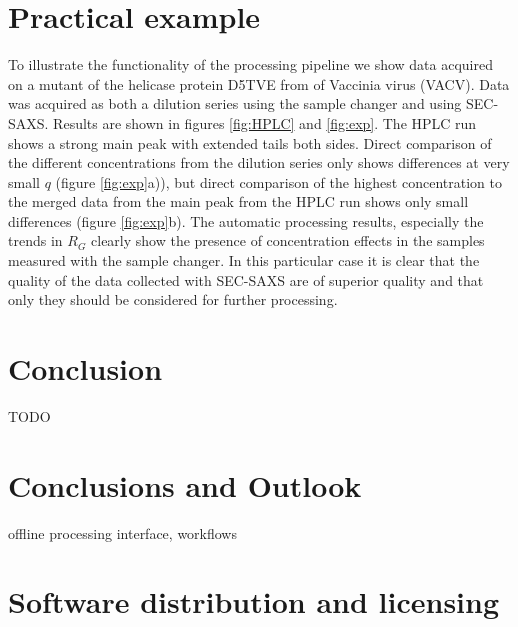 \documentclass[preprint,pdf]{iucr}              %
\begin{document}
\section{Practical example}
To illustrate the functionality of the processing pipeline we show data acquired
on a mutant of the helicase protein D5TVE from  of Vaccinia virus (VACV). 
Data was acquired as both a dilution series using the sample changer and using
SEC-SAXS.  
Results are shown in figures \ref{fig:HPLC} and \ref{fig:exp}. 
The HPLC run shows a strong main peak with extended tails both sides. 
Direct comparison of the different concentrations from the dilution series only
shows differences at very small $q$ (figure \ref{fig:exp}a)), but direct comparison 
of the highest concentration to the merged data from the main peak from the HPLC run 
shows only small differences (figure \ref{fig:exp}b).
The automatic processing results, especially the trends in $R_{G}$  clearly show the 
presence of concentration effects in the samples measured with the sample changer. 
In this particular case it is clear that the quality of the data collected with SEC-SAXS 
are of superior quality and that only they should be considered for further
processing.

\section{Conclusion}

TODO

\section{Conclusions and Outlook}
offline processing interface, workflows





\appendix
\section{Software distribution and licensing}
\end{document}
